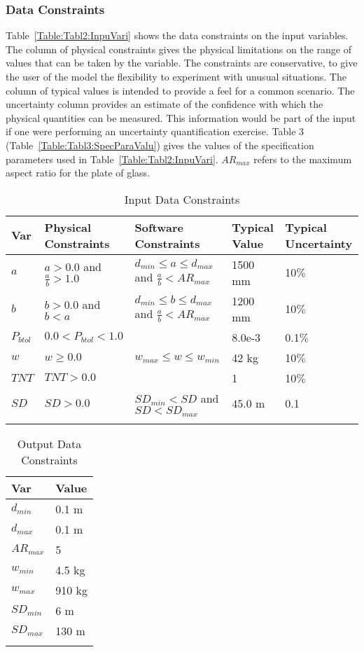 \documentclass[12pt]{article}
\begin{document}
\subsubsection{Data Constraints}
\label{Sec:DataCons}
Table~\ref{Table:Tabl2:InpuVari} shows the data constraints on the input variables. The column of physical constraints gives the physical limitations on the range of values that can be taken by the variable. The constraints are conservative, to give the user of the model the flexibility to experiment with unusual situations. The column of typical values is intended to provide a feel for a common scenario. The uncertainty column provides an estimate of the confidence with which the physical quantities can be measured. This information would be part of the input if one were performing an uncertainty quantification exercise. Table 3 (Table~\ref{Table:Tabl3:SpecParaValu}) gives the values of the specification parameters used in Table~\ref{Table:Tabl2:InpuVari}. $AR_{max}$ refers to the maximum aspect ratio for the plate of glass.
\begin{longtable}{l l l l l}
\toprule
Var & Physical Constraints & Software Constraints & Typical Value & Typical Uncertainty
\\
\midrule
$a$ & $a>0.0$ and $\frac{a}{b}>1.0$ & $d_{min}\leq{}a\leq{}d_{max}$ and $\frac{a}{b}<AR_{max}$ & 1500 mm & 10$\%$
\\
$b$ & $b>0.0$ and $b<a$ & $d_{min}\leq{}b\leq{}d_{max}$ and $\frac{a}{b}<AR_{max}$ & 1200 mm & 10$\%$
\\
$P_{btol}$ & $0.0<P_{btol}<1.0$ &  & 8.0e-3 & 0.1$\%$
\\
$w$ & $w\geq{}0.0$ & $w_{max}\leq{}w\leq{}w_{min}$ & 42 kg & 10$\%$
\\
$TNT$ & $TNT>0.0$ &  & 1 & 10$\%$
\\
$SD$ & $SD>0.0$ & $SD_{min}<SD$ and $SD<SD_{max}$ & $45.0$ m & 0.1
\\
\bottomrule
\caption{Input Data Constraints}
\label{Table:InpuDataCons}
\end{longtable}
\begin{longtable}{l l}
\toprule
Var & Value
\\
\midrule
$d_{min}$ & 0.1 m
\\
$d_{max}$ & 0.1 m
\\
$AR_{max}$ & 5
\\
$w_{min}$ & 4.5 kg
\\
$w_{max}$ & 910 kg
\\
$SD_{min}$ & 6 m
\\
$SD_{max}$ & 130 m
\\
\bottomrule
\caption{Output Data Constraints}
\label{Table:OutpDataCons}
\end{longtable}
\end{document}
